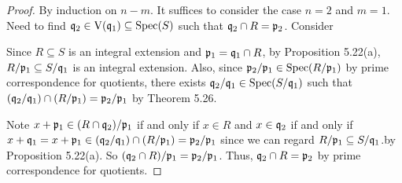 \begin{proof}
    By induction on $n-m$. It suffices to consider the case $n = 2$ and $m = 1$. Need to find $\mathfrak{q}_2 \in \operatorname{V}(\mathfrak{q}_1) \subseteq \operatorname{Spec}(S)$ such that $\mathfrak{q}_2 \cap R = \mathfrak{p}_2$. Consider
    \begin{center}
    \end{center}
    Since $R \subseteq S$ is an integral extension and $\mathfrak{p}_1 = \mathfrak{q}_1 \cap R$, by Proposition 5.22(a), $R/\mathfrak{p}_1 \subseteq S/\mathfrak{q}_1$ is an integral extension. Also, since $\mathfrak{p}_2/\mathfrak{p}_1 \in \operatorname{Spec}(R/\mathfrak{p}_1)$ by prime correspondence for quotients, there exists $\mathfrak{q}_2/\mathfrak{q}_1 \in \operatorname{Spec}(S/\mathfrak{q}_1)$ such that $(\mathfrak{q}_2/\mathfrak{q}_1) \cap (R/\mathfrak{p}_1) = \mathfrak{p}_2/\mathfrak{p}_1$ by Theorem 5.26. \par 
    Note $x + \mathfrak{p}_1 \in (R \cap \mathfrak{q}_2)/\mathfrak{p}_1$ if and only if $x \in R$ and $x \in \mathfrak{q}_2$ if and only if $x + \mathfrak{q}_1 = x + \mathfrak{p}_1 \in (\mathfrak{q}_2/\mathfrak{q}_1) \cap (R/\mathfrak{p}_1) = \mathfrak{p}_2/\mathfrak{p}_1$ since we can regard $R/\mathfrak{p}_1 \subseteq S/\mathfrak{q}_1$.by Proposition 5.22(a). So $(\mathfrak{q}_2 \cap R)/\mathfrak{p}_1 = \mathfrak{p}_2/\mathfrak{p}_1$. Thus, $\mathfrak{q}_2 \cap R = \mathfrak{p}_2$ by prime correspondence for quotients.
\end{proof}

